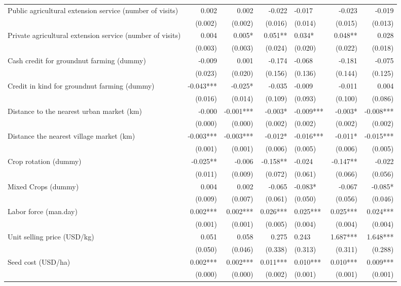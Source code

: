 \documentclass[
]{article}
\begin{document}
\begin{longtable}[t]{lrrrlrr}
Public agricultural extension service (number of visits) & 0.002 & 0.002 & -0.022 & -0.017 & -0.023 & -0.019\\
 & (0.002) & (0.002) & (0.016) & (0.014) & (0.015) & (0.013)\\
Private agricultural extension service (number of visits) & 0.004 & 0.005* & 0.051** & 0.034* & 0.048** & 0.028\\
 & (0.003) & (0.003) & (0.024) & (0.020) & (0.022) & (0.018)\\
\addlinespace
Cash credit for groundnut farming (dummy) & -0.009 & 0.001 & -0.174 & -0.068 & -0.181 & -0.075\\
 & (0.023) & (0.020) & (0.156) & (0.136) & (0.144) & (0.125)\\
Credit in kind for groundnut farming (dummy) & -0.043*** & -0.025* & -0.035 & -0.009 & -0.011 & 0.004\\
 & (0.016) & (0.014) & (0.109) & (0.093) & (0.100) & (0.086)\\
Distance to the nearest urban market (km) & -0.000 & -0.001*** & -0.003* & -0.009*** & -0.003* & -0.008***\\
\addlinespace
 & (0.000) & (0.000) & (0.002) & (0.002) & (0.002) & (0.002)\\
Distance the nearest village market (km) & -0.003*** & -0.003*** & -0.012* & -0.016*** & -0.011* & -0.015***\\
 & (0.001) & (0.001) & (0.006) & (0.005) & (0.006) & (0.005)\\
Crop rotation (dummy) & -0.025** & -0.006 & -0.158** & -0.024 & -0.147** & -0.022\\
 & (0.011) & (0.009) & (0.072) & (0.061) & (0.066) & (0.056)\\
\addlinespace
Mixed Crops (dummy) & 0.004 & 0.002 & -0.065 & -0.083* & -0.067 & -0.085*\\
 & (0.009) & (0.007) & (0.061) & (0.050) & (0.056) & (0.046)\\
Labor force (man.day) & 0.002*** & 0.002*** & 0.026*** & 0.025*** & 0.025*** & 0.024***\\
 & (0.001) & (0.001) & (0.005) & (0.004) & (0.004) & (0.004)\\
Unit selling price (USD/kg) & 0.051 & 0.058 & 0.275 & 0.243 & 1.687*** & 1.648***\\
\addlinespace
 & (0.050) & (0.046) & (0.338) & (0.313) & (0.311) & (0.288)\\
Seed cost (USD/ha) & 0.002*** & 0.002*** & 0.011*** & 0.010*** & 0.010*** & 0.009***\\
 & (0.000) & (0.000) & (0.002) & (0.001) & (0.001) & (0.001)\\

\end{longtable}
\end{document}
